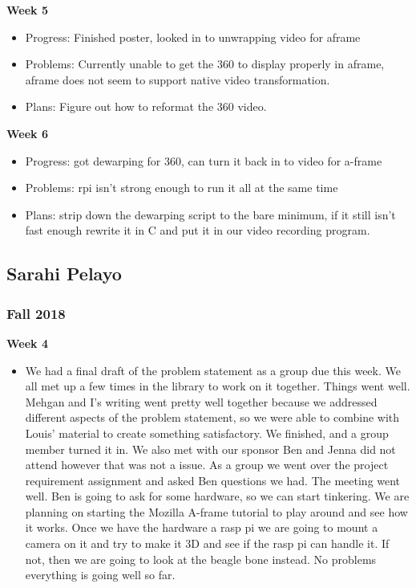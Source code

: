 \documentclass[onecolumn, draftclsnofoot,10pt, compsoc]{IEEEtran}
\begin{document}
        \textbf{Week 5}
        \begin{itemize}
            \item Progress: Finished poster, looked in to unwrapping video for aframe

            \item Problems: Currently unable to get the 360 to display properly in aframe, aframe does not seem to support native video transformation.

            \item Plans: Figure out how to reformat the 360 video.
        \end{itemize}
        \textbf{Week 6}
        \begin{itemize}
            \item Progress: got dewarping for 360, can turn it back in to video for a-frame

            \item Problems: rpi isn't strong enough to run it all at the same time

            \item Plans: strip down the dewarping script to the bare minimum, if it still isn't fast enough rewrite it in C and put it in our video recording program.
        \end{itemize}
        
    \subsection{Sarahi Pelayo}
    \subsubsection{Fall 2018}
            \textbf{Week 4}
            \begin{itemize}
                \item We had a final draft of the problem statement as a group due this week. We all met up a few times in the library to work on it together. Things went well. Mehgan and I’s writing went pretty well together because we addressed different aspects of the problem statement, so we were able to combine with Louis’ material to create something satisfactory. We finished, and a group member turned it in. We also met with our sponsor Ben and Jenna did not attend however that was not a issue. As a group we went over the project requirement assignment and asked Ben questions we had. The meeting went well. Ben is going to ask for some hardware, so we can start tinkering. We are planning on starting the Mozilla A-frame tutorial to play around and see how it works. Once we have the hardware a rasp pi we are going to mount a camera on it and try to make it 3D and see if the rasp pi can handle it. If not, then we are going to look at the beagle bone instead. No problems everything is going well so far.
            \end{itemize}
            
\end{document}
